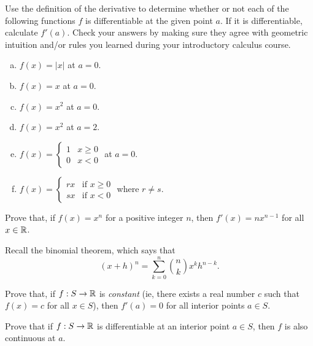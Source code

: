 \begin{exercise}
	Use the definition of the derivative to determine whether or not each of the following functions $f$ is differentiable at the given point $a$. If it is differentiable, calculate $f'(a)$. Check your answers by making sure they agree with geometric intuition and/or rules you learned during your introductory calculus course. 
	\begin{enumerate}[(a)]
		\item $f(x) = |x|$ at $a = 0$.
		\item $f(x) = x$ at $a = 0$. 
		\item $f(x) = x^2$ at $a = 0$. 
		\item $f(x) = x^2$ at $a = 2$. 
		\item $f(x) = \begin{cases} 1 & x \geq 0 \\ 0 & x < 0 \end{cases}$ at $a = 0$. 
		\item $f(x) = \begin{cases} rx & \text{if } x \geq 0 \\ sx & \text{if } x < 0 \end{cases}$ where $r \neq s$. 
	\end{enumerate}
\end{exercise}

\begin{exercise} \label{power-rule-positive} 
	Prove that, if $f(x) = x^n$ for a positive integer $n$, then $f'(x) = nx^{n-1}$ for all $x \in \mathbb{R}$. \begin{hint} Recall the binomial theorem, which says that
	\[ (x+h)^n = \sum_{k = 0}^n \binom{n}{k} x^k h^{n-k}. \]
	\end{hint}
\end{exercise}

\begin{exercise} \label{constant-implies-derivative-zero-single}
	Prove that, if $f : S \to \mathbb{R}$ is \emph{constant} (ie, there exists a real number $c$ such that $f(x) = c$ for all $x \in S$), then $f'(a) = 0$ for all interior points $a \in S$. 
\end{exercise}

\begin{exercise} \label{differentiable-implies-continuous-single}
	Prove that if $f : S \to \mathbb{R}$ is differentiable at an interior point $a \in S$, then $f$ is also continuous at $a$. 
\end{exercise}

